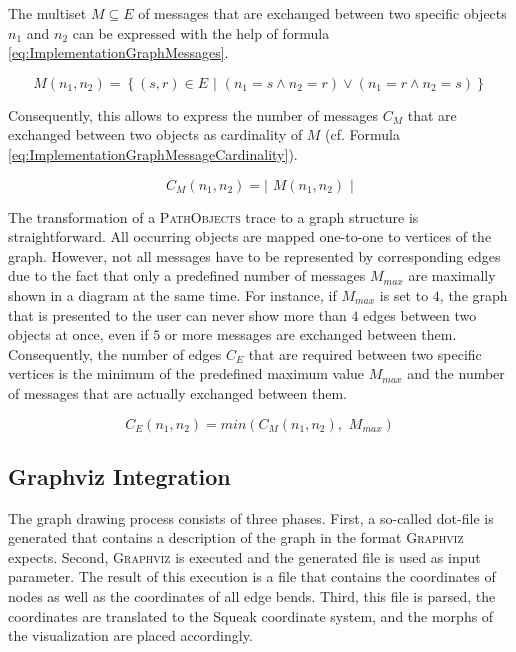The multiset $M \subseteq E$ of messages that are exchanged between two specific objects $n_1$ and $n_2$ can be expressed with the help of formula \ref{eq:ImplementationGraphMessages}.

\begin{equation}
M(n_1, n_2) = \left\{ (s,r) \in E \phantom{i}| \phantom{i} (n_1 = s \land n_2 = r) \lor (n_1 = r \land n_2 = s) \right\}
\label{eq:ImplementationGraphMessages}
\end{equation}

Consequently, this allows to express the number of messages $C_M$ that are exchanged between two objects as cardinality of $M$ (cf. Formula \ref{eq:ImplementationGraphMessageCardinality}).

\begin{equation}
C_M(n_1, n_2) = \left\vert \phantom{i} M(n_1, n_2) \phantom{i} \right\vert
\label{eq:ImplementationGraphMessageCardinality}
\end{equation}

The transformation of a \textsc{PathObjects} trace to a graph structure is straightforward.
All occurring objects are mapped one-to-one to vertices of the graph.
However, not all messages have to be represented by corresponding edges due to the fact that only a predefined number of messages $M_{max}$ are maximally shown in a diagram at the same time.
For instance, if $M_{max}$ is set to $4$, the graph that is presented to the user can never show more than $4$ edges between two objects at once, even if $5$ or more messages are exchanged between them.
Consequently, the number of edges $C_E$ that are required between two specific vertices is the minimum of the predefined maximum value $M_{max}$ and the number of messages that are actually exchanged between them.

\begin{equation}
C_E(n_1, n_2) = min(C_M(n_1, n_2),\phantom{i} M_{max})
\end{equation}

\subsection{Graphviz Integration}

The graph drawing process consists of three phases.
First, a so-called dot-file is generated that contains a description of the graph in the format \textsc{Graphviz} expects.
Second, \textsc{Graphviz} is executed and the generated file is used as input parameter.
The result of this execution is a file that contains the coordinates of nodes as well as the coordinates of all edge bends.
Third, this file is parsed, the coordinates are translated to the Squeak coordinate system, and the morphs of the visualization are placed accordingly.

